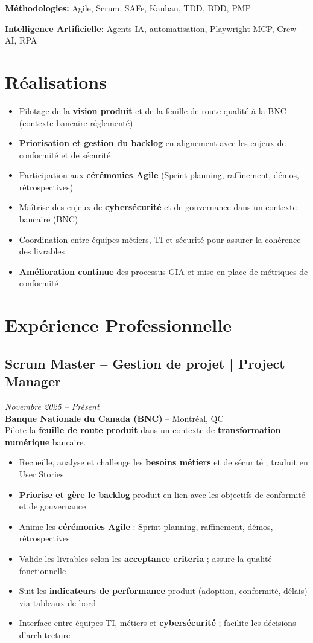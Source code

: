 \documentclass[11pt,a4paper]{article}
\begin{document}
\textbf{Méthodologies:} Agile, Scrum, SAFe, Kanban, TDD, BDD, PMP

\textbf{Intelligence Artificielle:} Agents IA, automatisation, Playwright MCP, Crew AI, RPA

\vspace{6pt}

\section*{Réalisations}
\begin{itemize}
    \item Pilotage de la \textbf{vision produit} et de la feuille de route qualité à la BNC (contexte bancaire réglementé)
    \item \textbf{Priorisation et gestion du backlog} en alignement avec les enjeux de conformité et de sécurité
    \item Participation aux \textbf{cérémonies Agile} (Sprint planning, raffinement, démos, rétrospectives)
    \item Maîtrise des enjeux de \textbf{cybersécurité} et de gouvernance dans un contexte bancaire (BNC)
    \item Coordination entre équipes métiers, TI et sécurité pour assurer la cohérence des livrables
    \item \textbf{Amélioration continue} des processus GIA et mise en place de métriques de conformité
\end{itemize}

\section*{Expérience Professionnelle}

\subsection*{Scrum Master -- Gestion de projet | Project Manager} \hfill \textit{Novembre 2025 -- Présent}\\
\textbf{Banque Nationale du Canada (BNC)} -- Montréal, QC\\
Pilote la \textbf{feuille de route produit} dans un contexte de \textbf{transformation numérique} bancaire.
\begin{itemize}
    \item Recueille, analyse et challenge les \textbf{besoins métiers} et de sécurité ; traduit en User Stories
    \item \textbf{Priorise et gère le backlog} produit en lien avec les objectifs de conformité et de gouvernance
    \item Anime les \textbf{cérémonies Agile} : Sprint planning, raffinement, démos, rétrospectives
    \item Valide les livrables selon les \textbf{acceptance criteria} ; assure la qualité fonctionnelle
    \item Suit les \textbf{indicateurs de performance} produit (adoption, conformité, délais) via tableaux de bord
    \item Interface entre équipes TI, métiers et \textbf{cybersécurité} ; facilite les décisions d'architecture
\end{itemize}
\end{document}
